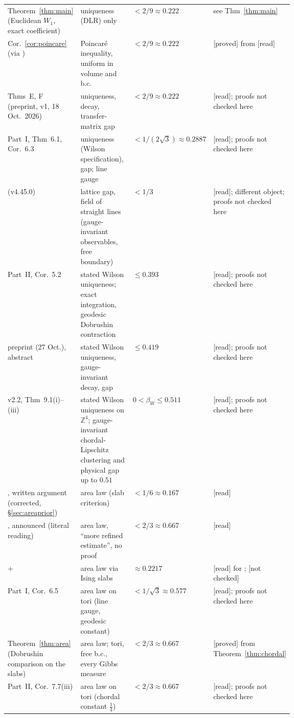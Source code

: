 \documentclass[11pt,a4paper]{article}
\theoremstyle{remark}
\theoremstyle{definition}
\theoremstyle{plain}
\theoremstyle{remark}
\newcommand{\Z}{\mathbb{Z}}
\newcommand{\st}[1]{\textsf{[#1]}}
\begin{document}
\begin{table}[htbp]
\begin{tabularx}{\linewidth}{@{}>{\raggedright\arraybackslash}p{0.25\linewidth}>{\raggedright\arraybackslash}X>{\raggedright\arraybackslash}p{0.19\linewidth}>{\raggedright\arraybackslash}p{0.21\linewidth}@{}}
Theorem~\ref{thm:main} (Euclidean $W_1$, exact coefficient) & uniqueness (DLR) only & $<2/9\approx0.222$ & see Thm~\ref{thm:main}\\
Cor.~\ref{cor:poincare} (via \cite{Wu06}) & Poincar\'e inequality, uniform in volume and b.c. & $<2/9\approx0.222$ & \st{proved} from \st{read}\\
\cite{BB26} Thms~E, F (preprint, v1, 18 Oct.\ 2026) & uniqueness, decay, transfer-matrix gap & $<2/9\approx0.222$ & \st{read}; proofs not checked here\\
\cite{Raj26a} Part~I, Thm~6.1, Cor.~6.3 & uniqueness (Wilson specification), gap; line gauge & $<1/(2\sqrt3)\approx0.2887$ & \st{read}; proofs not checked here\\
\cite[Thm~A]{BB26e} (v4.45.0) & lattice gap, field of straight lines (gauge-invariant observables, free boundary) & $<1/3$ & \st{read}; different object; proofs not checked here\\
\cite{Raj26a} Part~II, Cor.~5.2 & stated Wilson uniqueness; exact integration, geodesic Dobrushin contraction & $\le0.393$ & \st{read}; proofs not checked here\\
\cite{Raj26a} preprint (27 Oct.), abstract & stated Wilson uniqueness, gauge-invariant decay, gap & $\le0.419$ & \st{read}; proofs not checked here\\
\cite{Raj26b} v2.2, Thm~9.1(i)--(iii) & stated Wilson uniqueness on $\Z^4$; gauge-invariant chordal-Lipschitz clustering and physical gap up to $0.51$ & $0<\beta_W\le0.511$ & \st{read}; proofs not checked here\\
\midrule
\cite{DF80}, written argument (corrected, \S\ref{sec:areaprior}) & area law (slab criterion) & $<1/6\approx0.167$ & \st{read}\\
\cite{DF80}, announced (literal reading) & area law, ``more refined estimate'', no proof & $<2/3\approx0.667$ & \st{read}\\
\cite{Fro79} + \cite{ABF87} & area law via Ising slabs & $\approx0.2217$ & \st{read} for \cite{Fro79}; \st{not checked}\\
\cite{Raj26a} Part~I, Cor.~6.5 & area law on tori (line gauge, geodesic constant) & $<1/\sqrt3\approx0.577$ & \st{read}; proofs not checked here\\
Theorem~\ref{thm:area} (Dobrushin comparison on the slabs) & area law; tori, free b.c., every Gibbs measure & $<2/3\approx0.667$ & \st{proved} from Theorem~\ref{thm:chordal}\\
\cite{Raj26a} Part~II, Cor.~7.7(iii) & area law on tori (chordal constant $\frac14$) & $<2/3\approx0.667$ & \st{read}; proofs not checked here\\

\end{tabularx}
\end{table}
\end{document}

